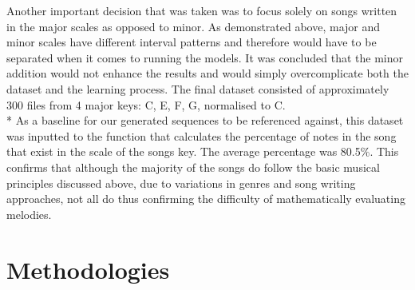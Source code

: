 \documentclass[12pt]{article}
\begin{document}
\begin{flushright}
\begin{minipage}[t]{0.96\linewidth}
    Another important decision that was taken was to focus solely on songs written in the major scales as opposed to minor. As demonstrated above, major and minor scales have different interval patterns and therefore would have to be separated when it comes to running the models. It was concluded that the minor addition would not enhance the results and would simply overcomplicate both the dataset and the learning process. The final dataset consisted of approximately 300 files from 4 major keys: C, E, F, G, normalised to C. \\*
    As a baseline for our generated sequences to be referenced against, this dataset was inputted to the function that calculates the percentage of notes in the song that exist in the scale of the songs key. The average percentage was 80.5\%. This confirms that although the majority of the songs do follow the basic musical principles discussed above, due to variations in genres and song writing approaches, not all do thus confirming the difficulty of mathematically evaluating melodies.
    \end{minipage}
  \end{flushright}
\section*{Methodologies}
\end{document}
